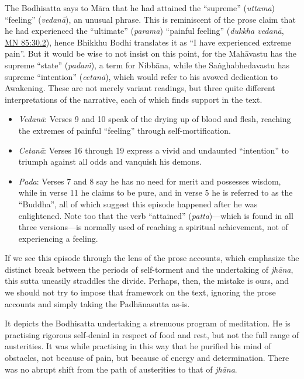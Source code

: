 \documentclass[12pt,openany]{book}%
\begin{document}
The Bodhisatta says to \textsanskrit{Māra} that he had attained the “supreme” (\textit{uttama}) “feeling” (\textit{\textsanskrit{vedanā}}), an unusual phrase. This is reminiscent of the prose claim that he had experienced the “ultimate” (\textit{parama}) “painful feeling” (\textit{dukkha \textsanskrit{vedanā}}, \href{https://suttacentral.net/mn85/en/sujato\#30.2}{MN 85:30.2}), hence Bhikkhu Bodhi translates it as “I have experienced extreme pain”. But it would be wise to not insist on this point, for the \textsanskrit{Mahāvastu} has the supreme “state” (\textit{\textsanskrit{padaṁ}}), a term for \textsanskrit{Nibbāna}, while the \textsanskrit{Saṅghabhedavastu} has supreme “intention” (\textit{\textsanskrit{cetanā}}), which would refer to his avowed dedication to Awakening. These are not merely variant readings, but three quite different interpretations of the narrative, each of which finds support in the text.

\begin{itemize}%
\item \textit{\textsanskrit{Vedanā}}: Verses 9 and 10 speak of the drying up of blood and flesh, reaching the extremes of painful “feeling” through self-mortification.%
\item \textit{\textsanskrit{Cetanā}}: Verses 16 through 19 express a vivid and undaunted “intention” to triumph against all odds and vanquish his demons.%
\item \textit{Pada}: Verses 7 and 8 say he has no need for merit and possesses wisdom, while in verse 11 he claims to be pure, and in verse 5 he is referred to as the “Buddha”, all of which suggest this episode happened after he was enlightened. Note too that the verb “attained” (\textit{patta})—which is found in all three versions—is normally used of reaching a spiritual achievement, not of experiencing a feeling.%
\end{itemize}

If we see this episode through the lens of the prose accounts, which emphasize the distinct break between the periods of self-torment and the undertaking of \textit{\textsanskrit{jhāna}}, this sutta uneasily straddles the divide. Perhaps, then, the mistake is ours, and we should not try to impose that framework on the text, ignoring the prose accounts and simply taking the \textsanskrit{Padhānasutta} as-is.

It depicts the Bodhisatta undertaking a strenuous program of meditation. He is practising rigorous self-denial in respect of food and rest, but not the full range of austerities. It was while practising in this way that he purified his mind of obstacles, not because of pain, but because of energy and determination. There was no abrupt shift from the path of austerities to that of \textit{\textsanskrit{jhāna}}.
\end{document}
